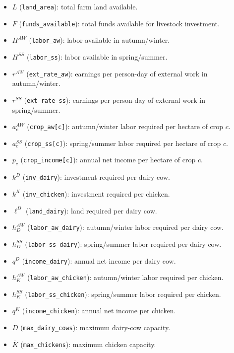 \begin{itemize}
    \item $L$ (\texttt{land\_area}): total farm land available.
    \item $F$ (\texttt{funds\_available}): total funds available for livestock investment.
    \item $H^{AW}$ (\texttt{labor\_aw}): labor available in autumn/winter.
    \item $H^{SS}$ (\texttt{labor\_ss}): labor available in spring/summer.
    \item $r^{AW}$ (\texttt{ext\_rate\_aw}): earnings per person-day of external work in autumn/winter.
    \item $r^{SS}$ (\texttt{ext\_rate\_ss}): earnings per person-day of external work in spring/summer.
    
    \item $a_c^{AW}$ (\texttt{crop\_aw[c]}): autumn/winter labor required per hectare of crop $c$.
    \item $a_c^{SS}$ (\texttt{crop\_ss[c]}): spring/summer labor required per hectare of crop $c$.
    \item $p_c$ (\texttt{crop\_income[c]}): annual net income per hectare of crop $c$.
    
    \item $k^D$ (\texttt{inv\_dairy}): investment required per dairy cow.
    \item $k^K$ (\texttt{inv\_chicken}): investment required per chicken.
    \item $\ell^D$ (\texttt{land\_dairy}): land required per dairy cow.
    \item $h_D^{AW}$ (\texttt{labor\_aw\_dairy}): autumn/winter labor required per dairy cow.
    \item $h_D^{SS}$ (\texttt{labor\_ss\_dairy}): spring/summer labor required per dairy cow.
    \item $q^D$ (\texttt{income\_dairy}): annual net income per dairy cow.
    \item $h_K^{AW}$ (\texttt{labor\_aw\_chicken}): autumn/winter labor required per chicken.
    \item $h_K^{SS}$ (\texttt{labor\_ss\_chicken}): spring/summer labor required per chicken.
    \item $q^K$ (\texttt{income\_chicken}): annual net income per chicken.
    \item $\overline{D}$ (\texttt{max\_dairy\_cows}): maximum dairy-cow capacity.
    \item $\overline{K}$ (\texttt{max\_chickens}): maximum chicken capacity.
\end{itemize}

